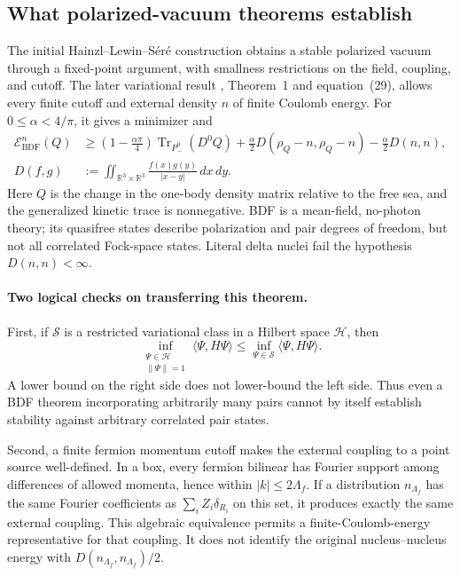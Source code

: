 \subsection{What polarized-vacuum theorems establish}
\label{app-rel:bdf}

The initial Hainzl--Lewin--S\'er\'e construction
\cite{HLS2004} obtains a stable polarized vacuum through a fixed-point
argument, with smallness restrictions on the field, coupling, and cutoff.
The later variational result \cite{HLS2005}, Theorem~1 and equation~(29),
allows every finite cutoff and external density $n$ of finite Coulomb energy.
For $0\le\alpha<4/\pi$, it gives a minimizer and
\begin{align}
 \mathcal E^{n}_{\mathrm{BDF}}(Q)
 &\ge
 \left(1-\frac{\alpha\pi}{4}\right)
       \operatorname{Tr}_{P_-^0}(D^0Q)
 +\frac{\alpha}{2}D(\rho_Q-n,\rho_Q-n)
 -\frac{\alpha}{2}D(n,n),
 \label{app-rel:bdf-bound}\\
 D(f,g)&:=\iint_{\mathbb R^3\times\mathbb R^3}
             \frac{f(x)g(y)}{|x-y|}\,dx\,dy.
 \nonumber
\end{align}
Here $Q$ is the change in the one-body density matrix relative to the free
sea, and the generalized kinetic trace is nonnegative. BDF is a
mean-field, no-photon theory; its quasifree states describe polarization and
pair degrees of freedom, but not all correlated Fock-space states. Literal
delta nuclei fail the hypothesis $D(n,n)<\infty$.

\paragraph{Two logical checks on transferring this theorem.}
First, if $\mathcal S$ is a restricted variational class in a Hilbert space
$\mathcal H$, then
\begin{equation}
 \inf_{\substack{\Psi\in\mathcal H\\\|\Psi\|=1}}
 \langle\Psi,H\Psi\rangle
 \le
 \inf_{\Psi\in\mathcal S}\langle\Psi,H\Psi\rangle.
 \label{app-rel:variational-direction}
\end{equation}
A lower bound on the right side does not lower-bound the left side. Thus
even a BDF theorem incorporating arbitrarily many pairs cannot by itself
establish stability against arbitrary correlated pair states.

Second, a finite fermion momentum cutoff makes the external coupling to a
point source well-defined. In a box, every fermion bilinear has Fourier
support among differences of allowed momenta, hence within $|k|\le2\Lambda_f$.
If a distribution $n_{\Lambda_f}$ has the same Fourier coefficients as
$\sum_i Z_i\delta_{R_i}$ on this set, it produces exactly the same
external coupling. This algebraic equivalence permits a finite-Coulomb-energy
representative for that coupling. It does not identify the original
nucleus--nucleus energy with $D(n_{\Lambda_f},n_{\Lambda_f})/2$.


